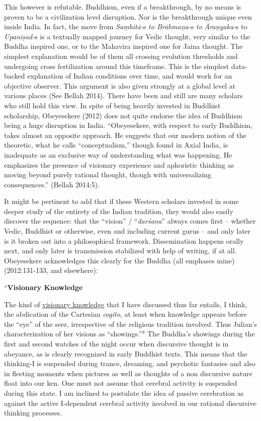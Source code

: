 This however is refutable. Buddhism, even if a breakthrough, by no means is proven to be a civilization level disruption. Nor is the breakthrough unique even inside India. In fact, the move from \textit{Saṃhitā-}s\textit{ to Brāhmaṇa-}s\textit{ to} \textit{Āraṇyaka-}s to \textit{Upaniṣad-}s is a textually mapped journey for Vedic thought, very similar to the Buddha inspired one, or to the Mahavira inspired one for Jaina thought. The simplest explanation would be of them all crossing evolution thresholds and undergoing cross fertilization around this timeframe. This is the simplest data-backed explanation of Indian conditions over time, and would work for an objective observer. This argument is also given strongly at a global level at various places (See Bellah 2014). There have been and still are many scholars who still hold this view. In spite of being heavily invested in Buddhist scholarship, Obeyesekere (2012) does not quite endorse the idea of Buddhism being a huge disruption in India. “Obeyesekere, with respect to early Buddhism, takes almost an opposite approach. He suggests that our modern notion of the theoretic, what he calls “conceptualism,” though found in Axial India, is inadequate as an exclusive way of understanding what was happening. He emphasizes the presence of visionary experience and aphoristic thinking as moving beyond purely rational thought, though with universalizing consequences.” (Bellah 2014:5).

It might be pertinent to add that if these Western scholars invested in some deeper study of the entirety of the Indian tradition, they would also easily discover the sequence: that the “vision” / “\textit{darśana}” always comes first – whether Vedic, Buddhist or otherwise, even and including current gurus – and only later is it broken out into a philosophical framework. Dissemination happens orally next, and only later is transmission stabilized with help of writing, if at all. Obeyesekere acknowledges this clearly for the Buddha (all emphases mine) (2012:131-133, and elsewhere):

\begin{myquote}
“\textbf{Visionary Knowledge}
\end{myquote}

\begin{myquote}
The kind of \underline{visionary knowledge} that I have discussed thus far entails, I think, the abdication of the Cartesian \textit{cogito}, at least when knowledge appears before the “eye” of the seer, irrespective of the religious tradition involved. Thus Julian’s characterization of her visions as “showings.”$^{8}$ The Buddha’s showings during the first and second watches of the night occur when discursive thought is in abeyance, as is clearly recognized in early Buddhist texts. This means that the thinking-I is suspended during trance, dreaming, and psychotic fantasies and also in ﬂeeting moments when pictures as well as thoughts of a non discursive nature ﬂoat into our ken. One must not assume that cerebral activity is suspended during this state. I am inclined to postulate the idea of passive cerebration as against the active I-dependent cerebral activity involved in our rational discursive thinking processes.
\end{myquote}

